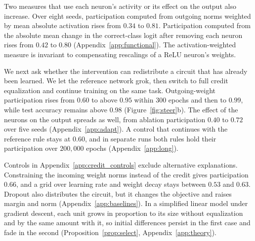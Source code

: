 \documentclass{article} %
\begin{document}
Two measures that use each neuron's activity or its effect on the output also increase. Over eight seeds, participation computed from outgoing norms weighted by mean absolute activation rises from $0.34$ to $0.81$. Participation computed from the absolute mean change in the correct-class logit after removing each neuron rises from $0.42$ to $0.80$ (Appendix~\ref{app:functional}). The activation-weighted measure is invariant to compensating rescalings of a ReLU neuron's weights.

We next ask whether the intervention can redistribute a circuit that has already been learned. We let the reference network grok, then switch to full credit equalization and continue training on the same task. Outgoing-weight participation rises from $0.60$ to above $0.95$ within $300$ epochs and then to $0.99$, while test accuracy remains above $0.98$ (Figure~\ref{fig:steer}b). The effect of the neurons on the output spreads as well, from ablation participation $0.40$ to $0.72$ over five seeds (Appendix~\ref{app:adapt}). A control that continues with the reference rule stays at $0.60$, and in separate runs both rules hold their participation over $200{,}000$ epochs (Appendix~\ref{app:long}).

Controls in Appendix~\ref{app:credit_controls} exclude alternative explanations. Constraining the incoming weight norms instead of the credit gives participation $0.66$, and a grid over learning rate and weight decay stays between $0.53$ and $0.63$. Dropout also distributes the circuit, but it changes the objective and raises margin and norm (Appendix~\ref{app:baselines}). In a simplified linear model under gradient descent, each unit grows in proportion to its size without equalization and by the same amount with it, so initial differences persist in the first case and fade in the second (Proposition~\ref{prop:select}, Appendix~\ref{app:theory}).
\end{document}
